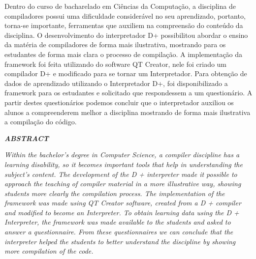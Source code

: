 \documentclass[12pt,oneside,a4paper,chapter=TITLE,section=TITLE,sumario=tradicional]{abntex2}
\begin{document}

\imprimircapa
\imprimirfolhaderosto


\begin{resumo}
	Dentro do curso de bacharelado em Ciências da Computação, a disciplina de compiladores possui uma dificuldade considerável no seu aprendizado, portanto, torna-se importante, ferramentas que auxiliem na compreensão do conteúdo da disciplina. O desenvolvimento do interpretador D+ possibilitou abordar o ensino da matéria de compiladores de forma mais ilustrativa, mostrando para os estudantes de forma mais clara o processo de compilação. A implementação da framework foi feita utilizando do software QT Creator, nele foi criado um compilador D+ e modificado para se tornar um Interpretador. Para obtenção de dados de aprendizado utilizando o Interpretador D+, foi disponibilizado a framework para os estudantes e solicitado que respondessem a um questionário. A partir destes questionários podemos concluir que o interpretador auxiliou os alunos a compreenderem melhor a disciplina  mostrando de forma mais ilustrativa a compilação do código.
    

\newpage
\begin{center}
\textbf{\textit{ABSTRACT}}
\end{center}
\textit{Within the bachelor's degree in Computer Science, a compiler discipline has a learning disability, so it becomes important tools that help in understanding the subject's content. The development of the D + interpreter made it possible to approach the teaching of compiler material in a more illustrative way, showing students more clearly the compilation process. The implementation of the framework was made using QT Creator software, created from a D + compiler and modified to become an Interpreter. To obtain learning data using the D + Interpreter, the framework was made available to the students and asked to answer a questionnaire. From these questionnaires we can conclude that the interpreter helped the students to better understand the discipline by showing more compilation of the code.
}



\end{resumo}
\end{document}
